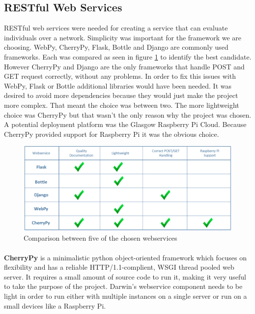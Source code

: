 \subsection{RESTful Web Services} 
RESTful web services were needed for creating a service that can evaluate individuals over a network. Simplicity was important for the framework we are
choosing. WebPy\cite{webpy}, CherryPy\cite{cherrypy}, Flask\cite{flask}, Bottle\cite{bottle} and Django\cite{django} are commonly used frameworks. Each was compared as seen in figure \ref{fig:webtab} to identify the best candidate. 
However CherryPy and Django are the only frameworks that handle POST and GET request correctly, without any problems. In order to fix this issues with WebPy, Flask\cite{flask} or Bottle\cite{bottle} additional
libraries would have been needed. It was desired to avoid more dependencies because they would just make the project more complex. That meant the choice was between two. The more lightweight
choice was CherryPy but that wasn't the only reason why the project was chosen. A potential deployment platform was the Glasgow Raspberry Pi Cloud\cite{picloud}. Because CherryPy provided support for Raspberry Pi\cite{raspi} it was the obvious choice.

\begin{figure}[htp]
\centering
\includegraphics[scale=0.6]{Figures/webtable.png}
\caption{Comparison between five of the chosen webservices}
\label{fig:webtab}
\end{figure}

\paragraph{}
\textbf{CherryPy}
is a minimalistic python object-oriented framework which focuses on flexibility and has a reliable HTTP/1.1-complient, WSGI thread
pooled web server. It requires a small amount of source code to run it, making it very useful to take the purpose of the project. Darwin's webservice component
needs to be light in order to run either with multiple instances on a single server or run on a small devices like a Raspberry Pi.

